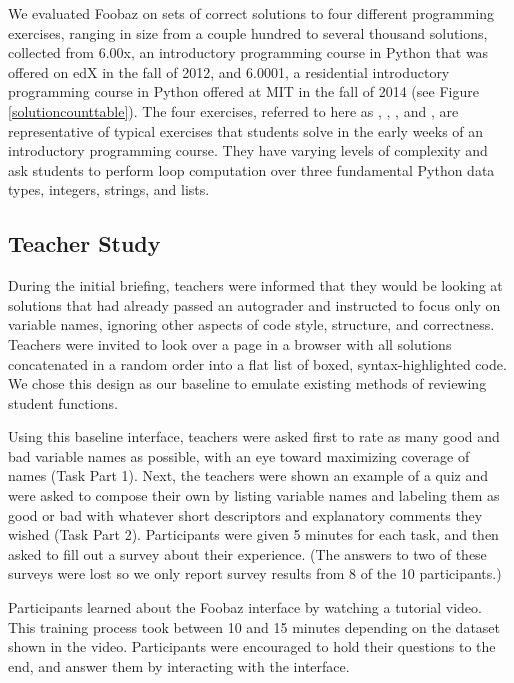 We evaluated Foobaz on sets of correct solutions to four different programming exercises, ranging in size from a couple hundred to several thousand solutions, collected from 6.00x, an introductory programming course in Python that was offered on edX in the fall of 2012, and 6.0001, a residential introductory programming course in Python offered at MIT in the fall of 2014 (see Figure \ref{solutioncounttable}). The four exercises, referred to here as , , , and , are representative of typical exercises that students solve in the early weeks of an introductory programming course. They have varying levels of complexity and ask students to perform loop computation over three fundamental Python data types, integers, strings, and lists.

\subsection{Teacher Study}

During the initial briefing, teachers were informed that they would be looking at solutions that had already passed an autograder and instructed to focus only on variable names, ignoring other aspects of code style, structure, and correctness. Teachers were invited to look over a page in a browser with all solutions concatenated in a random order into a flat list of boxed, syntax-highlighted code. We chose this design as our baseline to emulate existing methods of reviewing student functions. 

Using this baseline interface, teachers were asked first to rate as many good and bad variable names as possible, with an eye toward maximizing coverage of names (Task Part 1). Next, the teachers were shown an example of a quiz and were asked to compose their own by listing variable names and labeling them as good or bad with whatever short descriptors and explanatory comments they wished (Task Part 2). Participants were given 5 minutes for each task, and then asked to fill out a survey about their experience. (The answers to two of these surveys were lost so we only report survey results from 8 of the 10 participants.)

Participants learned about the Foobaz interface by watching a tutorial video. This training process took between 10 and 15 minutes depending on the dataset shown in the video. Participants were encouraged to hold their questions to the end, and answer them by interacting with the interface. 


